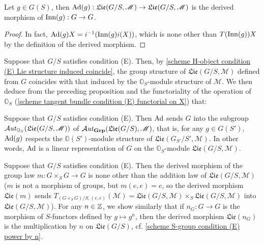 \begin{proposition}\label{scheme group Lie Ad is derived of Inn}
Let $g\in G(S)$, then $\mathrm{Ad}(g):\mathfrak{Lie}(G/S,\mathscr{M})\to\mathfrak{Lie}(G/S,\mathscr{M})$ is the derived morphism of $\mathrm{Inn}(g):G\to G$.
\end{proposition}
\begin{proof}
In fact, $\mathrm{Ad}(g)X=i^{-1}(\mathrm{Inn}(g)i(X))$, which is none other than $T(\mathrm{Inn}(g))X$ by the definition of the derived morphism.
\end{proof}

Suppose that $G/S$ satisfies condition (E). Then, by \cref{scheme H-object condition (E) Lie structure induced coincide}, the group structure of $\mathfrak{Lie}(G/S,\mathscr{M})$ defined from $G$ coincides with that induced by the $\mathbb{O}_S$-module structure of $\mathscr{M}$. We then deduce from the preceding proposition and the functoriality of the operation of $\mathbb{O}_S$ (\cref{scheme tangent bundle condition (E) functorial on X}) that:

\begin{corollary}\label{scheme group condition (E) Ad is linear representation}
Suppose that $G/S$ satisfies condition (E). Then $\mathrm{Ad}$ sends $G$ into the subgroup $\operatorname{\mathcal{A}\hspace*{-0.2pt}\textit{ut}\hspace{0.5pt}}_{\mathbb{O}_S}(\mathfrak{Lie}(G/S,\mathscr{M}))$ of $\operatorname{\mathcal{A}\hspace*{-0.2pt}\textit{ut}\hspace{0.5pt}}_{\mathbf{Grp}}(\mathfrak{Lie}(G/S),\mathscr{M})$, that is, for any $g\in G(S')$, $\mathrm{Ad}(g)$ respects the $\mathbb{O}(S')$-module structure of $\mathfrak{Lie}(G_{S'}/S',\mathscr{M})$. In other words, $\mathrm{Ad}$ is a linear representation of $G$ on the $\mathbb{O}_S$-module $\mathfrak{Lie}(G/S,\mathscr{M})$.
\end{corollary}

\begin{remark}
Suppose that $G/S$ satisfies condition (E). Then the derived morphism of the group law $m:G\times_SG\to G$ is none other than the addition law of $\mathfrak{Lie}(G/S,\mathscr{M})$ ($m$ is not a morphism of groups, but $m(e,e)=e$, so the derived morphism $\mathfrak{Lie}(m)$ sends $T_{(G\times_SG)/S,(e,e)}(\mathscr{M})=\mathfrak{Lie}(G/S,\mathscr{M})\times_S\mathfrak{Lie}(G/S,\mathscr{M})$ into $\mathfrak{Lie}(G/S,\mathscr{M})$). For any $n\in\mathbb{Z}$, we show similarly that if $n_G:G\to G$ is the morphism of $S$-functors defined by $g\mapsto g^n$, then the derived morphism $\mathfrak{Lie}(n_G)$ is the multiplication by $n$ on $\mathfrak{Lie}(G/S)$, cf. \cref{scheme S-group condition (E) power by n}.
\end{remark}

